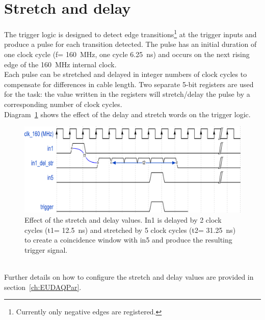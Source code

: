 \section{Stretch and delay}
The trigger logic is designed to detect edge transitions\footnote{Currently only negative edges are registered.} at the trigger inputs and produce a pulse for each transition detected. The pulse has an initial duration of one clock cycle (f= 160~MHz, one cycle 6.25~ns) and occurs on the next rising edge of the 160~MHz internal clock.\\
Each pulse can be stretched and delayed in integer numbers of clock cycles to compensate for differences in cable length. Two separate 5-bit registers are used for the task: the value written in the registers will stretch/delay the pulse by a corresponding number of clock cycles.\\
Diagram~\ref{Fig:trigger_stretchdelay} shows the effect of the delay and stretch words on the trigger logic.
\begin{figure}
  \centering
  \includegraphics[width=.90\textwidth]{./Images/tlu_trigger_logic.pdf}
  \caption{Effect of the stretch and delay values. In1 is delayed by 2 clock cycles (t1= 12.5~ns) and stretched by 5 clock cycles (t2= 31.25~ns) to create a coincidence window with in5 and produce the resulting trigger signal.}
  \label{Fig:trigger_stretchdelay}
\end{figure}\\
 Further details on how to configure the stretch and delay values are provided in section~\ref{ch:EUDAQPar}.